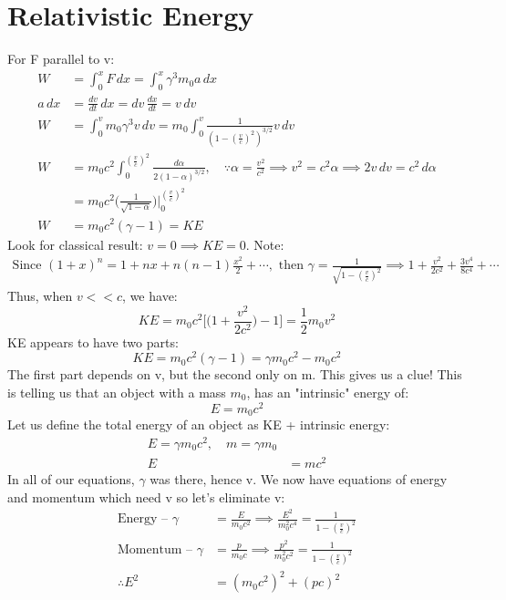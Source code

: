 \documentclass[a4paper, 11pt, normalem]{report}
\begin{document}
\section{Relativistic Energy}
For F parallel to v:
\begin{align}
    W &= \int_{0}^{x} F\,dx = \int_{0}^{x} \gamma^{3} m_{0}a\,dx \\
    a\,dx &= \frac{dv}{dt}\,dx = dv\,\frac{dx}{dt} = v\,dv \\
    W &= \int_{0}^{v} m_{0}\gamma^{3}v\,dv = m_{0}\int_{0}^{v} \frac{1}{(1 - (\tfrac{v}{c})^{2})^{3/2}}v\,dv \\
    W &= m_{0}c^{2}\int_{0}^{(\tfrac{v}{c})^{2}} \frac{d\alpha}{2(1 - \alpha)^{3/2}},\quad \because \alpha = \frac{v^{2}}{c^{2}} \implies v^{2} = c^{2}\alpha \implies 2v\,dv = c^{2}\,d\alpha \\
      &= m_{0}c^{2}\Big(\frac{1}{\sqrt{1 - \alpha}}\Big)\Bigg|_{0}^{(\tfrac{v}{c})^{2}} \\
    W &= m_{0}c^{2}(\gamma - 1) = KE
\end{align}
Look for classical result: $v = 0 \implies KE = 0$.
Note:
\begin{align}
    \text{Since }(1 + x)^{n} = 1 + nx + n(n - 1)\frac{x^{2}}{2} + \cdots, \text{ then }\gamma = \frac{1}{\sqrt{1 - (\tfrac{v}{c})^{2}}} \implies 1 + \frac{v^{2}}{2c^{2}} + \frac{3v^{4}}{8c^{4}} + \cdots
\end{align}
Thus, when $v << c$, we have:
\begin{equation}
    KE  = m_{0}c^{2}\Big[\Big(1 + \frac{v^{2}}{2c^{2}}\Big) - 1\Big] = \frac{1}{2}m_{0}v^{2}
\end{equation}
KE appears to have two parts:
\begin{equation}
    KE = m_{0}c^{2}(\gamma - 1) = \gamma m_{0}c^{2} - m_{0}c^{2}
\end{equation}
The first part depends on v, but the second only on m.
This gives us a clue!
This is telling us that an object with a mass $m_{0}$, has an "intrinsic" energy of:
\begin{equation}
    E = m_{0}c^{2}
\end{equation}
Let us define the total energy of an object as KE + intrinsic energy:
\begin{align}
    E = \gamma m_{0}c^{2}, \quad m = \gamma m_{0} \\
    E &= mc^{2}
\end{align}
In all of our equations, $\gamma$ was there, hence v. We now have equations of energy and momentum which need v so let's eliminate v:
\begin{align}
    \text{Energy -- }\gamma &= \frac{E}{m_{0}c^{2}} \implies \frac{E^{2}}{m_{0}^{2}c^{4}} = \frac{1}{1 - (\tfrac{v}{c})^{2}} \\
    \text{Momentum -- }\gamma &= \frac{p}{m_{0}c} \implies \frac{p^{2}}{m_{0}^{2}c^{2}} = \frac{1}{1 - (\tfrac{v}{c})^{2}} \\
    \therefore E^{2} &= (m_{0}c^{2})^{2} + (pc)^{2}
\end{align}
\end{document}
